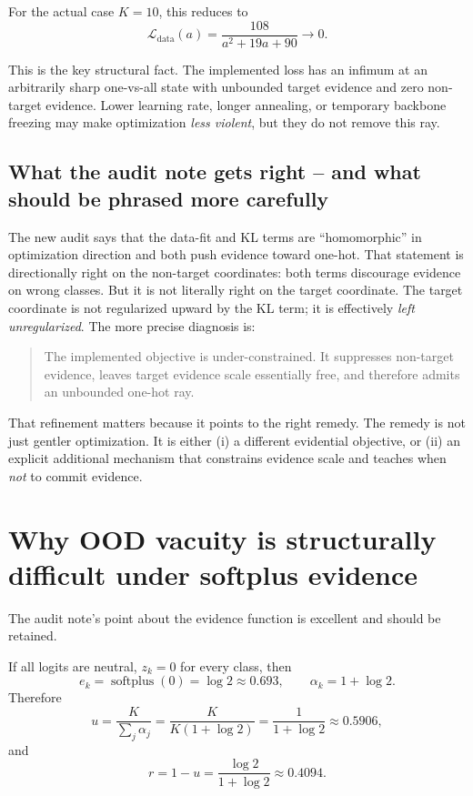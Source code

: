 \documentclass[11pt]{article}
\begin{document}
For the actual case $K=10$, this reduces to
\[
\mathcal{L}_{\mathrm{data}}(a) = \frac{108}{a^2 + 19a + 90} \to 0.
\]

This is the key structural fact. The implemented loss has an infimum at an arbitrarily sharp one-vs-all state with unbounded target evidence and zero non-target evidence. Lower learning rate, longer annealing, or temporary backbone freezing may make optimization \emph{less violent}, but they do not remove this ray.

\subsection*{What the audit note gets right -- and what should be phrased more carefully}

The new audit says that the data-fit and KL terms are ``homomorphic'' in optimization direction and both push evidence toward one-hot. That statement is directionally right on the non-target coordinates: both terms discourage evidence on wrong classes. But it is not literally right on the target coordinate. The target coordinate is not regularized upward by the KL term; it is effectively \emph{left unregularized}. The more precise diagnosis is:

\begin{quote}
The implemented objective is under-constrained. It suppresses non-target evidence, leaves target evidence scale essentially free, and therefore admits an unbounded one-hot ray.
\end{quote}

That refinement matters because it points to the right remedy. The remedy is not just gentler optimization. It is either (i) a different evidential objective, or (ii) an explicit additional mechanism that constrains evidence scale and teaches when \emph{not} to commit evidence.

\section{Why OOD vacuity is structurally difficult under softplus evidence}

The audit note's point about the evidence function is excellent and should be retained.

If all logits are neutral, $z_k=0$ for every class, then
\[
e_k = \operatorname{softplus}(0)=\log 2 \approx 0.693,
\qquad
\alpha_k = 1+\log 2.
\]
Therefore
\[
u = \frac{K}{\sum_j \alpha_j}
= \frac{K}{K(1+\log 2)}
= \frac{1}{1+\log 2}
\approx 0.5906,
\]
and
\[
r = 1-u = \frac{\log 2}{1+\log 2} \approx 0.4094.
\]
\end{document}
